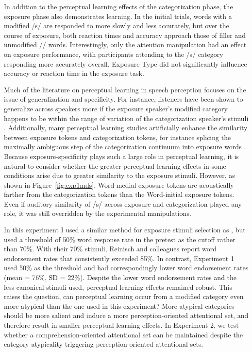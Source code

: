 In addition to the perceptual learning effects of the categorization phase, the exposure phase also demonstrates learning.  
In the initial trials, words with a modified /s/ are responded to more slowly and less accurately, but over the course of exposure, both reaction times and accuracy approach those of filler and unmodified /\textesh/ words.
Interestingly, only the attention manipulation had an effect on exposure performance, with participants attending to the /s/ category responding more accurately overall.
Exposure Type did not significantly influence accuracy or reaction time in the exposure task.

Much of the literature on perceptual learning in speech perception focuses on the issue of generalization and specificity.
For instance, listeners have been shown to generalize across speakers more if the exposure speaker's modified category happens to be within the range of variation of the categorization speaker's stimuli \citep{Eisner2005,Kraljic2005}.
Additionally, many perceptual learning studies artificially enhance the similarity between exposure tokens and categorization tokens, for instance splicing the maximally ambiguous step of the categorization continuum into exposure words \citep{Norris2003}.
Because exposure-specificity plays such a large role in perceptual learning, it is natural to consider whether the greater perceptual learning effects in some conditions arise due to greater similarity to the exposure stimuli.
However, as shown in Figure~\ref{fig:exp1mds}, Word-medial exposure tokens are acoustically farther from the categorization tokens than the Word-initial exposure tokens.  
Even if auditory similarity of /s/ across exposure and categorization played any role, it was still overridden by the experimental manipulations.

In this experiment I used a similar method for exposure stimuli selection as \citet{Reinisch2013}, but used a threshold of 50\% word response rate in the pretest as the cutoff rather than 70\%.
With their 70\% stimuli, Reinisch and colleagues report word endorsement rates that consistently exceeded 85\%.
In contrast, Experiment 1 used 50\% as the threshold and had correspondingly lower word endorsement rates (mean = 76\%, SD = 22\%).  
Despite the lower word endorsement rates and the less canonical stimuli used, perceptual learning effects remained robust.
This raises the question, can perceptual learning occur from a modified category even more atypical than the one used in this experiment?
More atypical categories should be more salient and induce a more perception-oriented attentional set, and therefore result in smaller perceptual learning effects.
In Experiment 2, we test whether a comprehension-oriented attentional set can be maintained despite the category atypicality triggering perception-oriented attentional sets.

